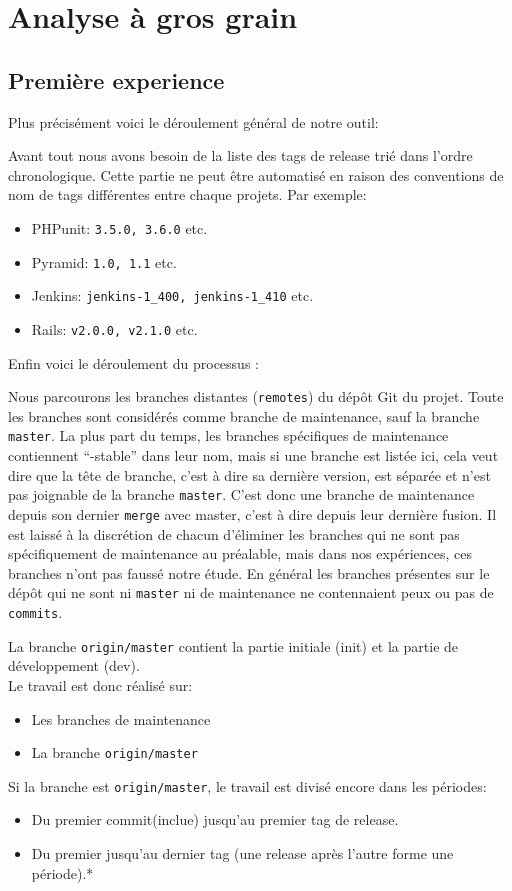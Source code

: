 \section{Analyse à gros grain}
\label{sec:analyse_gros_grain}

\subsection{Première experience}

Plus précisément voici le déroulement général de notre outil:

Avant tout nous avons besoin de la liste des tags de release trié dans l'ordre chronologique. Cette partie ne peut être automatisé en raison des conventions de nom de tags différentes entre chaque projets. Par exemple: 
\begin{itemize}
\item PHPunit: \texttt{3.5.0, 3.6.0} etc.
\item Pyramid: \texttt{1.0, 1.1} etc.
\item Jenkins: \texttt{jenkins-1\_400, jenkins-1\_410} etc.
\item Rails: \texttt{v2.0.0, v2.1.0} etc.
\end{itemize}
\medskip
Enfin voici le déroulement du processus :

Nous parcourons les branches distantes (\texttt{remotes}) du dépôt Git du projet. Toute les branches sont considérés comme branche de maintenance, sauf la branche \texttt{master}. La plus part du temps, les branches spécifiques de maintenance contiennent ``-stable'' dans leur nom, mais si une branche est listée ici, cela veut dire que la tête de branche, c'est à dire sa dernière version, est séparée et n'est pas joignable de la branche \texttt{master}. C'est donc une branche de maintenance depuis son dernier \texttt{merge} avec master, c'est à dire depuis leur dernière fusion. Il est laissé à la discrétion de chacun d'éliminer les branches qui ne sont pas spécifiquement de maintenance au préalable, mais dans nos expériences, ces branches n'ont pas faussé notre étude. En général les branches présentes sur le dépôt qui ne sont ni \texttt{master} ni de maintenance ne contennaient peux ou pas de \texttt{commits}.

La branche \texttt{origin/master} contient la partie initiale (init) et la partie de développement (dev).\\  
Le travail est donc réalisé sur: 
\begin{itemize}
\item Les branches de maintenance
\item La branche \texttt{origin/master}
\end{itemize}
\medskip
Si la branche est \texttt{origin/master}, le travail est divisé encore dans les périodes:
\begin{itemize}
\item Du premier commit(inclue) jusqu'au premier tag de release.
\item Du premier jusqu'au dernier tag (une release après l'autre forme une période).*
\end{itemize}
\medskip

